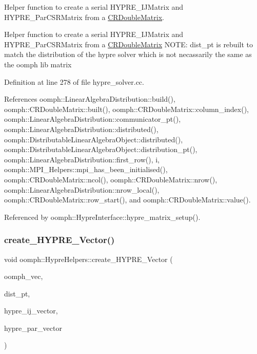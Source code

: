 Helper function to create a serial H\+Y\+P\+R\+E\+\_\+\+I\+J\+Matrix and H\+Y\+P\+R\+E\+\_\+\+Par\+C\+S\+R\+Matrix from a \hyperlink{classoomph_1_1CRDoubleMatrix}{C\+R\+Double\+Matrix}. 

Helper function to create a serial H\+Y\+P\+R\+E\+\_\+\+I\+J\+Matrix and H\+Y\+P\+R\+E\+\_\+\+Par\+C\+S\+R\+Matrix from a \hyperlink{classoomph_1_1CRDoubleMatrix}{C\+R\+Double\+Matrix} N\+O\+TE\+: dist\+\_\+pt is rebuilt to match the distribution of the hypre solver which is not necassarily the same as the oomph lib matrix 

Definition at line 278 of file hypre\+\_\+solver.\+cc.



References oomph\+::\+Linear\+Algebra\+Distribution\+::build(), oomph\+::\+C\+R\+Double\+Matrix\+::built(), oomph\+::\+C\+R\+Double\+Matrix\+::column\+\_\+index(), oomph\+::\+Linear\+Algebra\+Distribution\+::communicator\+\_\+pt(), oomph\+::\+Linear\+Algebra\+Distribution\+::distributed(), oomph\+::\+Distributable\+Linear\+Algebra\+Object\+::distributed(), oomph\+::\+Distributable\+Linear\+Algebra\+Object\+::distribution\+\_\+pt(), oomph\+::\+Linear\+Algebra\+Distribution\+::first\+\_\+row(), i, oomph\+::\+M\+P\+I\+\_\+\+Helpers\+::mpi\+\_\+has\+\_\+been\+\_\+initialised(), oomph\+::\+C\+R\+Double\+Matrix\+::ncol(), oomph\+::\+C\+R\+Double\+Matrix\+::nrow(), oomph\+::\+Linear\+Algebra\+Distribution\+::nrow\+\_\+local(), oomph\+::\+C\+R\+Double\+Matrix\+::row\+\_\+start(), and oomph\+::\+C\+R\+Double\+Matrix\+::value().



Referenced by oomph\+::\+Hypre\+Interface\+::hypre\+\_\+matrix\+\_\+setup().

\mbox{\label{namespaceoomph_1_1HypreHelpers_a550031a0d3e8b60296e42ef5e87d7b7f}} 
\subsubsection{\texorpdfstring{create\+\_\+\+H\+Y\+P\+R\+E\+\_\+\+Vector()}{create\_HYPRE\_Vector()}\hspace{0.1cm}{\footnotesize\ttfamily [1/2]}}
{\footnotesize\ttfamily void oomph\+::\+Hypre\+Helpers\+::create\+\_\+\+H\+Y\+P\+R\+E\+\_\+\+Vector (\begin{DoxyParamCaption}\item[{const \hyperlink{classoomph_1_1DoubleVector}{Double\+Vector} \&}]{oomph\+\_\+vec,  }\item[{const \hyperlink{classoomph_1_1LinearAlgebraDistribution}{Linear\+Algebra\+Distribution} $\ast$}]{dist\+\_\+pt,  }\item[{H\+Y\+P\+R\+E\+\_\+\+I\+J\+Vector \&}]{hypre\+\_\+ij\+\_\+vector,  }\item[{H\+Y\+P\+R\+E\+\_\+\+Par\+Vector \&}]{hypre\+\_\+par\+\_\+vector }\end{DoxyParamCaption})}



